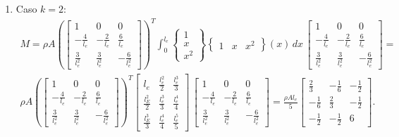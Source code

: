 \begin{tcolorbox}[breakable, colback=white, colframe=black, boxrule=0.4pt, arc=0pt, outer arc=0pt]
\begin{enumerate}[label=\alph*), leftmargin=*]
            \vspace{2mm}
            
            \item Caso $k=2$:
            $$\begin{aligned}
                M = \rho A  \left(\begin{bmatrix} 1 & 0 & 0 \\ -\frac{4}{l_e} & -\frac{2}{l_e} & \frac{6}{l_e} \\ \frac{3}{l_e^2} & \frac{3}{l_e^2} & -\frac{6}{l_e^2} \end{bmatrix}\right)^T \int_{0}^{l_e}  \begin{Bmatrix} 1 \\ x \\ x^2 \end{Bmatrix} \begin{Bmatrix} 1 & x & x^2 \end{Bmatrix}(x) \, dx \,\begin{bmatrix} 1 & 0 & 0 \\ -\frac{4}{l_e} & -\frac{2}{l_e} & \frac{6}{l_e} \\ \frac{3}{l_e^2} & \frac{3}{l_e^2} & -\frac{6}{l_e^2} \end{bmatrix} = \\
                \rho A \left(\begin{bmatrix} 1 & 0 & 0 \\ -\frac{4}{l_e} & -\frac{2}{l_e} & \frac{6}{l_e} \\ \frac{3}{l_e^2} & \frac{3}{l_e^2} & -\frac{6}{l_e^2} \end{bmatrix}\right)^T \begin{bmatrix} l_e  & \frac{l_e^2}{2} & \frac{l_e^3}{3} \\ \frac{l_E^2}{2} & \frac{l_e^3}{3} & \frac{l_e^4}{4} \\ \frac{l_E^3}{3} & \frac{l_e^4}{4} & \frac{l_e^5}{5} \end{bmatrix} \, \begin{bmatrix} 1 & 0 & 0 \\ -\frac{4}{l_e} & -\frac{2}{l_e} & \frac{6}{l_e} \\ \frac{3}{l_e^2} & \frac{3}{l_e^2} & -\frac{6}{l_e^2} \end{bmatrix} = \frac{\rho A l_e}{5} \begin{bmatrix} \frac{2}{3} & -\frac{1}{6} & -\frac{1}{2} \\ -\frac{1}{6} & \frac{2}{3} & -\frac{1}{2} \\ -\frac{1}{2} & -\frac{1}{2} & 6 \end{bmatrix}.
            \end{aligned}$$
        \end{enumerate}
        
        \vspace{2mm} %
    \end{tcolorbox}
\vspace{5mm}

